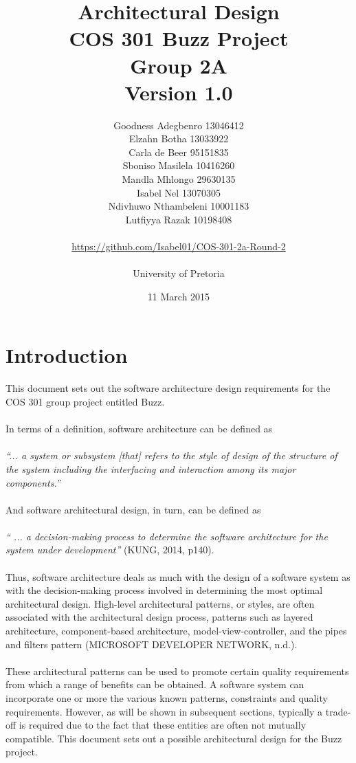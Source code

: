 \documentclass[a4paper]{article}
\title{Architectural Design
\\COS 301 Buzz Project
\\Group 2A
\\Version 1.0}
\author{Goodness Adegbenro 13046412
\\Elzahn Botha 13033922
\\Carla de Beer 95151835
\\Sboniso Masilela 10416260
\\Mandla Mhlongo 29630135
\\Isabel Nel 13070305
\\Ndivhuwo Nthambeleni 10001183
\\Lutfiyya Razak 10198408
\\
\\
\url{https://github.com/Isabel01/COS-301-2a-Round-2}
\\
\\ University of Pretoria}
\date{11 March 2015}
\begin{document}
\maketitle
\newpage


\tableofcontents
\newpage

\section{Introduction}
This document sets out the software architecture design requirements for the COS 301 group project entitled Buzz.
\\
\\In terms of a definition, software architecture can be defined as
\\
\\\textit{“... a system or subsystem [that] refers to the style of design of the structure of the system including the interfacing and interaction among its major components.”}
\\
\\And software architectural design, in turn, can be defined as
\\
\\\textit{“ ... a decision-making process to determine the software architecture for the system under development”} (KUNG, 2014, p140).
\\
\\Thus, software architecture deals as much with the design of a software system as with the decision-making process involved in determining the most optimal architectural design.
High-level architectural patterns, or styles, are often associated with the architectural design process, patterns such as layered architecture, component-based architecture, model-view-controller, and the pipes and filters pattern (MICROSOFT DEVELOPER NETWORK, n.d.).
\\
\\These architectural patterns can be used to promote certain quality requirements from which a range of benefits can be obtained. A software system can incorporate one or more the various known patterns, constraints and quality requirements. However, as will be shown in subsequent sections, typically a trade-off is required due to the fact that these entities are often not mutually compatible. This document sets out a possible architectural design for the Buzz project. 
\end{document}
